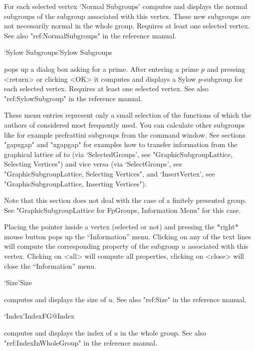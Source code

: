 For   each selected vertex `Normal  Subgroups'  computes and displays the
normal subgroups of the subgroup associated  with this vertex.  These new
subgroups are not  necessarily  normal in the  whole  group.  Requires at
least one selected vertex.  See also "ref:NormalSubgroups" in the {\GAP}
reference manual.

\>`Sylow Subgroups'{Sylow Subgroups}

pops  up a dialog  box asking   for a prime.   After entering  a  prime $p$ 
and pressing  <return> or  clicking  <OK> it computes   and displays  a Sylow
$p$-subgroup  for   each selected vertex.  Requires   at   least one selected
vertex.  See also "ref:SylowSubgroup" in the {\GAP}
reference manual.

\bigskip

These menu entries represent only a small selection of the functions
of {\GAP} which the authors of {\XGAP} considered most frequently
used. You can calculate other subgroups like for example prefrattini
subgroups from the {\GAP} command window. See sections "gapxgap" and
"xgapgap" for examples how to transfer information from the graphical
lattice of {\XGAP} to {\GAP} (via `SelectedGroups', see
"GraphicSubgroupLattice, Selecting Vertices") and vice versa (via
`SelectGroups', see "GraphicSubgroupLattice, Selecting Vertices", and
`InsertVertex', see "GraphicSubgroupLattice, Inserting Vertices").



Note that this section does not deal with the case of a finitely presented
group. See "GraphicSubgroupLattice for FpGroups, Information Menu" for this 
case.

Placing the pointer  inside a vertex (selected  or not)  and pressing the
*right* mouse button pops up the  ``Information'' menu.  Clicking on any of
the text  lines will compute  the corresponding  property of the subgroup
$u$ associated  with  this vertex.  Clicking   on <all> will  compute all
properties, clicking on <close> will close the ``Information'' menu.

\>`Size'{Size}

computes and displays the size of $u$.  See also "ref:Size" in the
{\GAP} reference manual.

\>`Index'{IndexFG}@{Index}

computes and displays the  index  of $u$ in   the whole group.  See  also
"ref:IndexInWholeGroup" in the {\GAP} reference manual.

